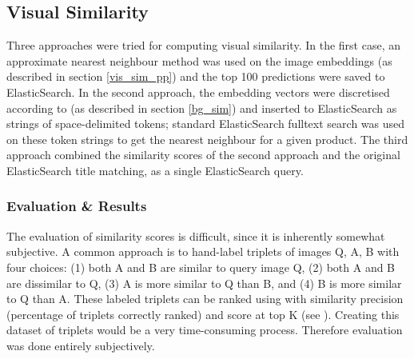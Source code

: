 \subsection{Visual Similarity}
\label{exp_sim}

Three approaches were tried for computing visual similarity.
In the first case, an approximate nearest neighbour method \cite{nmslib} was used on the image embeddings (as described in section \ref{vis_sim_pp}) and the top 100 predictions were saved to ElasticSearch.
In the second approach, the embedding vectors were discretised according to \cite{vec_fulltext} (as described in section \ref{bg_sim}) and inserted to ElasticSearch as strings of space-delimited tokens; standard ElasticSearch fulltext search was used on these token strings to get the nearest neighbour for a given product.
The third approach combined the similarity scores of the second approach and the original ElasticSearch title matching, as a single ElasticSearch query.

\subsubsection{Evaluation \& Results}

The evaluation of similarity scores is difficult, since it is inherently somewhat subjective.
A common approach is to hand-label triplets of images Q, A, B with four choices: (1) both A and B are similar to query image Q, (2) both A and B are dissimilar to Q, (3) A is more similar to Q than B, and (4) B is more similar to Q than A.
These labeled triplets can be ranked using with similarity precision (percentage of triplets correctly ranked) and score at top K (see \cite{imgsimfineg}).
Creating this dataset of triplets would be a very time-consuming process. Therefore evaluation was done entirely subjectively.

